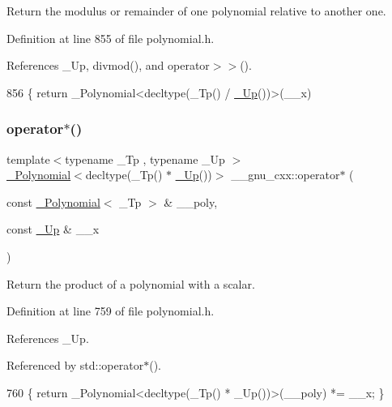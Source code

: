 Return the modulus or remainder of one polynomial relative to another one. 

Definition at line 855 of file polynomial.\+h.



References \+\_\+\+Up, divmod(), and operator$>$$>$().


\begin{DoxyCode}
856     \{ \textcolor{keywordflow}{return} \_Polynomial<decltype(\_Tp() / \hyperlink{namespace____gnu__cxx_ab693ea357b6429b331e0bf09f9442385}{\_Up}())>(\_\_x) %
\end{DoxyCode}
\mbox{\label{namespace____gnu__cxx_a1d0b1e9322fd407848b43cecab1ab9ae}} 
\subsubsection{\texorpdfstring{operator$\ast$()}{operator*()}\hspace{0.1cm}{\footnotesize\ttfamily [1/3]}}
{\footnotesize\ttfamily template$<$typename \+\_\+\+Tp , typename \+\_\+\+Up $>$ \\
\hyperlink{class____gnu__cxx_1_1__Polynomial}{\+\_\+\+Polynomial}$<$decltype(\+\_\+\+Tp() $\ast$ \hyperlink{namespace____gnu__cxx_ab693ea357b6429b331e0bf09f9442385}{\+\_\+\+Up}())$>$ \+\_\+\+\_\+gnu\+\_\+cxx\+::operator$\ast$ (\begin{DoxyParamCaption}\item[{const \hyperlink{class____gnu__cxx_1_1__Polynomial}{\+\_\+\+Polynomial}$<$ \+\_\+\+Tp $>$ \&}]{\+\_\+\+\_\+poly,  }\item[{const \hyperlink{namespace____gnu__cxx_ab693ea357b6429b331e0bf09f9442385}{\+\_\+\+Up} \&}]{\+\_\+\+\_\+x }\end{DoxyParamCaption})\hspace{0.3cm}{\ttfamily [inline]}}

Return the product of a polynomial with a scalar. 

Definition at line 759 of file polynomial.\+h.



References \+\_\+\+Up.



Referenced by std\+::operator$\ast$().


\begin{DoxyCode}
760     \{ \textcolor{keywordflow}{return} \_Polynomial<decltype(\_Tp() * \_Up())>(\_\_poly) *= \_\_x; \}
\end{DoxyCode}
\mbox{\label{namespace____gnu__cxx_a2f76fd6f7c2c9e64fba1d5892844f26b}} 
